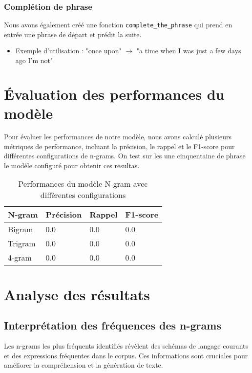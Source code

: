 \subsubsection*{Complétion de phrase}

Nous avons également créé une fonction \texttt{complete\_the\_phrase} qui prend en entrée une phrase de départ et prédit la suite.

\begin{itemize}
    \item Exemple d'utilisation : "once upon" $\rightarrow$ "a time when I was just a few days ago I’m not"
\end{itemize}

\section{Évaluation des performances du modèle}

Pour évaluer les performances de notre modèle, nous avons calculé plusieurs métriques de performance, incluant la précision, le rappel et le F1-score pour différentes configurations de n-grams.
On test sur les une cinquentaine de phrase le modèle configuré pour obtenir ces resultas.

\begin{table}[h]
    \centering
    \begin{tabular}{|l|l|l|l|}
    \hline
    \textbf{N-gram} & \textbf{Précision} & \textbf{Rappel} & \textbf{F1-score} \\ \hline
    Bigram & 0.0 & 0.0 & 0.0 \\ \hline
    Trigram & 0.0 & 0.0 & 0.0 \\ \hline
    4-gram & 0.0 & 0.0 & 0.0 \\ \hline
    \end{tabular}
    \caption{Performances du modèle N-gram avec différentes configurations}
\end{table}

\section{Analyse des résultats}

\subsection{Interprétation des fréquences des n-grams}

Les n-grams les plus fréquents identifiés révèlent des schémas de langage courants et des expressions fréquentes dans le corpus. Ces informations sont cruciales pour améliorer la compréhension et la génération de texte.

